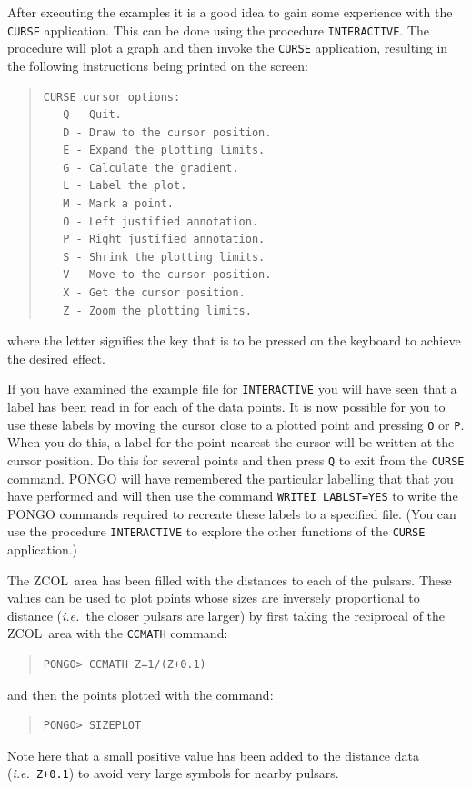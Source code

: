 \documentclass[twoside,11pt]{article}
\newcommand{\htmlref}[2]{#1}
\renewcommand{\_}{\texttt{\symbol{95}}}
\newcommand{\ie}{{\em i.e.\ }}
\newcommand{\zcol}{{\sf ZCOL}}
\newcommand{\cnam}[1]{{\tt #1}}
\newcommand{\iref} [1]{\htmlref{#1}{#1}}
\begin{document}
After executing the examples it is a good idea to gain some
experience with the \cnam{\iref{CURSE}} application.  This can be done
using the procedure \verb+INTERACTIVE+.  The procedure will plot a
graph and then invoke the \cnam{\iref{CURSE}} application, resulting
in the following instructions being printed on the screen:
\begin{quote}
\begin{verbatim}
CURSE cursor options:
   Q - Quit.
   D - Draw to the cursor position.
   E - Expand the plotting limits.
   G - Calculate the gradient.
   L - Label the plot.
   M - Mark a point.
   O - Left justified annotation.
   P - Right justified annotation.
   S - Shrink the plotting limits.
   V - Move to the cursor position.
   X - Get the cursor position.
   Z - Zoom the plotting limits.
\end{verbatim}
\end{quote}
where the letter signifies the key that is to be pressed on the keyboard to
achieve the desired effect.

If you have examined the example file for \verb+INTERACTIVE+ you will
have seen that a label has been read in for each of the data points.
It is now possible for you to use these labels by moving the cursor close to a
plotted point and pressing \verb+O+ or \verb+P+.
When you do this, a label for the point nearest the cursor will be written at
the cursor position.
Do this for several points and then press \verb+Q+ to exit from the
\cnam{\iref{CURSE}} command.
PONGO will have remembered the particular labelling that that you have
performed and will then use the command \cnam{\iref{WRITEI} LABLST=YES} to
write the PONGO commands required to recreate these labels to a
specified file.  (You can use the procedure \verb+INTERACTIVE+ to
explore the other functions of the \cnam{\iref{CURSE}} application.)

The \zcol\ area has been filled with the distances to each of the
pulsars.
These values can be used to plot points whose sizes are inversely proportional
to distance (\ie the closer pulsars are larger) by first taking the reciprocal
of the \zcol\ area with the \cnam{\iref{CCMATH}} command:
\begin{quote}
\begin{verbatim}
PONGO> CCMATH Z=1/(Z+0.1)
\end{verbatim}
\end{quote}
and then the points plotted with the command:
\begin{quote}
\begin{verbatim}
PONGO> SIZEPLOT
\end{verbatim}
\end{quote}
Note here that a small positive value has been added to the distance data
(\ie {\tt Z+0.1}) to avoid very large symbols for nearby pulsars.
\end{document}
